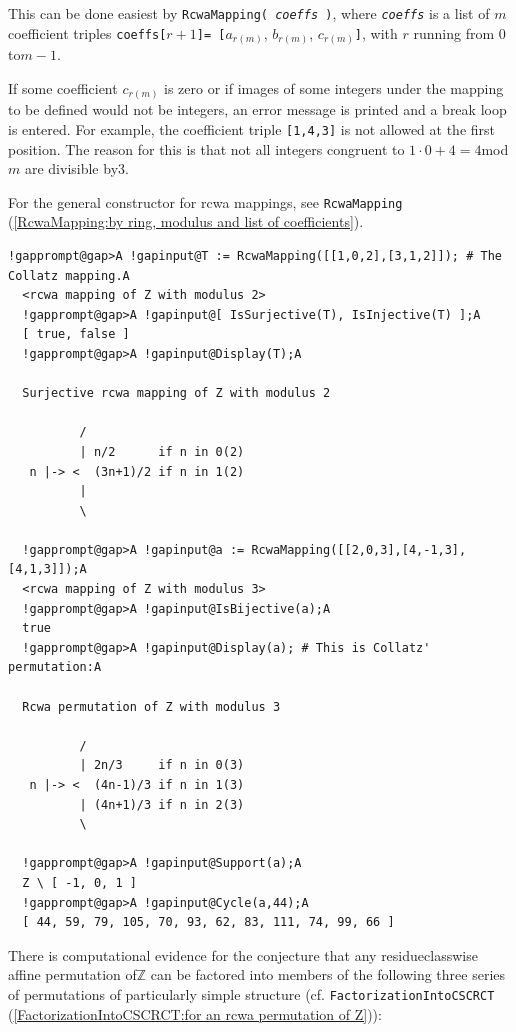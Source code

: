 \documentclass[a4paper,11pt]{report}
\begin{document}
{{ This can be done easiest by \texttt{RcwaMapping( \mbox{\texttt{\mdseries\slshape coeffs}} )}, where \mbox{\texttt{\mdseries\slshape coeffs}} is a list of $m$ coefficient triples \texttt{coeffs[}$r+1$\texttt{]{\nobreakspace}= [}$a_{r(m)}$, $b_{r(m)}$, $c_{r(m)}$\texttt{]}, with $r$ running from 0 to{\nobreakspace}$m-1$. 

 If some coefficient $c_{r(m)}$ is zero or if images of some integers under the mapping to be defined would
not be integers, an error message is printed and a break loop is entered. For
example, the coefficient triple \texttt{[1,4,3]} is not allowed at the first position. The reason for this is that not all
integers congruent to $1 \cdot 0 + 4 = 4${\nobreakspace}mod{\nobreakspace}$m$ are divisible by{\nobreakspace}3. 

 For the general constructor for rcwa mappings, see \texttt{RcwaMapping} (\ref{RcwaMapping:by ring, modulus and list of coefficients}). 
\begin{Verbatim}[commandchars=!@A,fontsize=\small,frame=single,label=Example]
  !gapprompt@gap>A !gapinput@T := RcwaMapping([[1,0,2],[3,1,2]]); # The Collatz mapping.A
  <rcwa mapping of Z with modulus 2>
  !gapprompt@gap>A !gapinput@[ IsSurjective(T), IsInjective(T) ];A
  [ true, false ]
  !gapprompt@gap>A !gapinput@Display(T);A
  
  Surjective rcwa mapping of Z with modulus 2
  
          /
          | n/2      if n in 0(2)
   n |-> <  (3n+1)/2 if n in 1(2)
          |
          \
  
  !gapprompt@gap>A !gapinput@a := RcwaMapping([[2,0,3],[4,-1,3],[4,1,3]]);A
  <rcwa mapping of Z with modulus 3>
  !gapprompt@gap>A !gapinput@IsBijective(a);A
  true
  !gapprompt@gap>A !gapinput@Display(a); # This is Collatz' permutation:A
  
  Rcwa permutation of Z with modulus 3
  
          /
          | 2n/3     if n in 0(3)
   n |-> <  (4n-1)/3 if n in 1(3)
          | (4n+1)/3 if n in 2(3)
          \
  
  !gapprompt@gap>A !gapinput@Support(a);A
  Z \ [ -1, 0, 1 ]
  !gapprompt@gap>A !gapinput@Cycle(a,44);A
  [ 44, 59, 79, 105, 70, 93, 62, 83, 111, 74, 99, 66 ]
\end{Verbatim}
 \noindent There is computational evidence for the conjecture that any
residue\texttt{}class\texttt{}wise affine permutation
of{\nobreakspace}{\ensuremath{\mathbb Z}} can be factored into members of the
following three series of permutations of particularly simple structure (cf. \texttt{FactorizationIntoCSCRCT} (\ref{FactorizationIntoCSCRCT:for an rcwa permutation of Z})): 

}}
\end{document}
